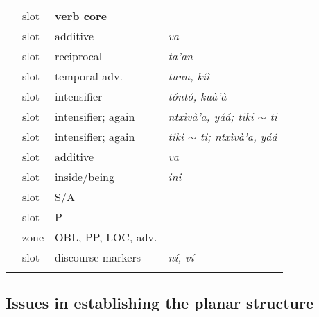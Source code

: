\documentclass[output=paper]{langscibook}
\begin{document}
\begin{table}
\begin{tabular}{Slll}
\textbf{\label{core}}     & slot          & \textbf{verb core}           & \textit{}                  \\
\label{addverb}               & slot          & additive                     & \textit{va}                \\
\label{rec}               & slot          & reciprocal      & \textit{ta'an} \\
\label{tuun}               & slot          & temporal adv.      & \textit{tuun, kíì}\\
\label{int1}               & slot          & intensifier     & \textit{tóntó, kuà'à} \\
\label{int2}               & slot          & intensifier; again    & \textit{ntxìvà'a, yáá; tiki $\sim$ ti} \\
\label{rep}             & slot          & intensifier; again                       & \textit{tiki $\sim$ ti; ntxìvà'a, yáá}                \\
\label{addadv}               & slot          & additive                     & \textit{va}                \\
\label{ini}               & slot          & inside/being                 & \textit{ini}               \\
\label{sarg}              & slot          & S/A                          & \textit{}                  \\
\label{parg}              & slot          & P                            & \textit{}                  \\
\label{obl}               & zone          & OBL, PP, LOC, adv.           & \textit{}                  \\
\label{dm}				& slot				& discourse markers				& \textit{ní, ví} \\
\lspbottomrule
\end{tabular}
\end{table}

\subsection{Issues in establishing the planar structure} %
\label{sub:issues}
\end{document}

